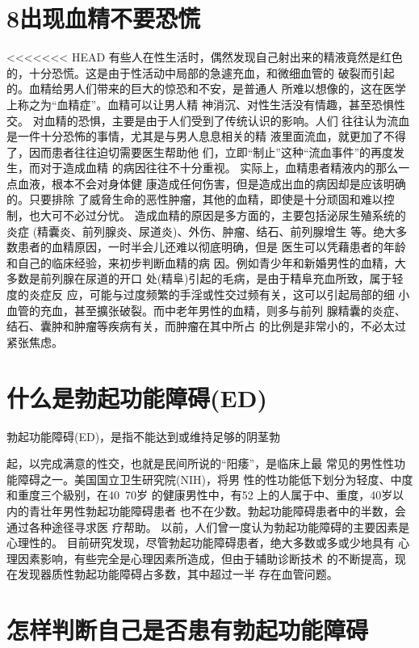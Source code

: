 \documentclass[12pt,UTF8]{ctexbook}
\begin{document}
\section{8出现血精不要恐慌}
<<<<<<< HEAD
有些人在性生活时，偶然发现自己射出来的精液竟然是红色
的，十分恐慌。这是由于性活动中局部的急遽充血，和微细血管的
破裂而引起的。血精给男人们带来的巨大的惊恐和不安，是普通人
所难以想像的，这在医学上称之为“血精症”。血精可以让男人精
神消沉、对性生活没有情趣，甚至恐惧性交。
对血精的恐惧，主要是由于人们受到了传统认识的影响。人们
往往认为流血是一件十分恐怖的事情，尤其是与男人息息相关的精
液里面流血，就更加了不得了，因而患者往往迫切需要医生帮助他
们，立即“制止”这种“流血事件”的再度发生，而对于造成血精
的病因往往不十分重视。
实际上，血精患者精液内的那么一点血液，根本不会对身体健
康造成任何伤害，但是造成出血的病因却是应该明确的。只要排除
了威脅生命的恶性肿瘤，其他的血精，即使是十分顽固和难以控
制，也大可不必过分忧。
造成血精的原因是多方面的，主要包括泌尿生殖系统的炎症
(精囊炎、前列腺炎、尿道炎)、外伤、肿瘤、结石、前列腺增生
等。绝大多数患者的血精原因，一时半会儿还难以彻底明确，但是
医生可以凭藉患者的年龄和自己的临床经验，来初步判断血精的病
因。例如青少年和新婚男性的血精，大多数是前列腺在尿道的开口
处(精阜)引起的毛病，是由于精阜充血所致，属于轻度的炎症反
应，可能与过度频繁的手淫或性交过频有关，这可以引起局部的细
小血管的充血，甚至擴张破裂。而中老年男性的血精，则多与前列
腺精囊的炎症、结石、囊肿和肿瘤等疾病有关，而肿瘤在其中所占
的比例是非常小的，不必太过紧张焦虑。
\section{什么是勃起功能障碍(ED)}
勃起功能障碍(ED)，是指不能达到或维持足够的阴茎勃

起，以完成满意的性交，也就是民间所说的“阳痿”，是临床上最
常见的男性性功能障碍之一。美国国立卫生研究院(NIH)，将男
性的性功能低下划分为轻度、中度和重度三个級别，在40~70岁
的健康男性中，有52%
上的人属于中、重度，40岁以内的青壮年男性勃起功能障碍患者
也不在少数。勃起功能障碍患者中的半数，会通过各种途径寻求医
疗帮助。
以前，人们曾一度认为勃起功能障碍的主要因素是心理性的。
目前研究发现，尽管勃起功能障碍患者，绝大多数或多或少地具有
心理因素影响，有些完全是心理因素所造成，但由于辅助诊断技术
的不断提高，现在发现器质性勃起功能障碍占多数，其中超过一半
存在血管问题。

\section{怎样判断自己是否患有勃起功能障碍}
\end{document}

